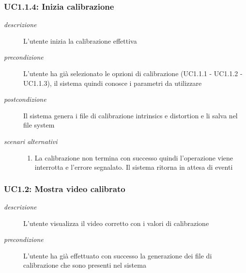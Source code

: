 \subsubsection{UC1.1.4: Inizia calibrazione} \label{sec:UC1.1.4}
\begin{description}
\item[\em{descrizione }]L'utente inizia la calibrazione effettiva
\item[\em{precondizione }] L'utente ha già selezionato le opzioni di calibrazione (UC1.1.1 - UC1.1.2 - UC1.1.3), il sistema quindi conosce i parametri da utilizzare
\item[\em{postcondizione }] Il sistema genera i file di calibrazione intrinsics e distortion e li salva nel file system
\item[\em{scenari alternativi }] \mbox{} 
\begin{enumerate} 
\item La calibrazione non termina con successo quindi l'operazione viene interrotta e l'errore segnalato. Il sistema ritorna in attesa di eventi
\end{enumerate}
\end{description}

\subsubsection{UC1.2: Mostra video calibrato} \label{sec:UC1.2}
\begin{description}
\item[\em{descrizione }]L'utente visualizza il video corretto con i valori di calibrazione
\item[\em{precondizione }] L'utente ha già effettuato con successo la generazione dei file di calibrazione che sono presenti nel sistema
\end{description}

